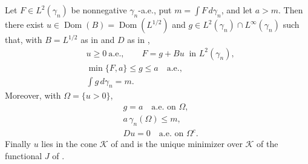\begin{theorem}
Let $F \in L^2(\gamma_n)$ be nonnegative $\gamma_n$-a.e., put
$m = \int F \, d\gamma_n$, and let $a > m$.  Then there exist
$u \in \operatorname{Dom}(B) = \operatorname{Dom}(L^{1/2})$ and
$g \in L^2(\gamma_n) \cap L^\infty(\gamma_n)$ such that, with $B = L^{1/2}$ as in
 and $D$ as in ,
\begin{align*}
  &u \geq 0 \ \text{a.e.}, \qquad F = g + Bu \ \text{ in } L^2(\gamma_n),\\
  &\min\{F, a\} \leq g \leq a \quad \text{a.e.},\\
  &\int g \, d\gamma_n = m .
\end{align*}
Moreover, with $\Omega = \{u > 0\}$,
\begin{align*}
  &g = a \quad\text{a.e. on } \Omega,\\
  &a\,\gamma_n(\Omega) \leq m,\\
  &Du = 0 \quad\text{a.e. on } \Omega^c .
\end{align*}
Finally $u$ lies in the cone $\mathcal{K}$ of  and is the
unique minimizer over $\mathcal{K}$ of the functional $J$ of
.
\end{theorem}
